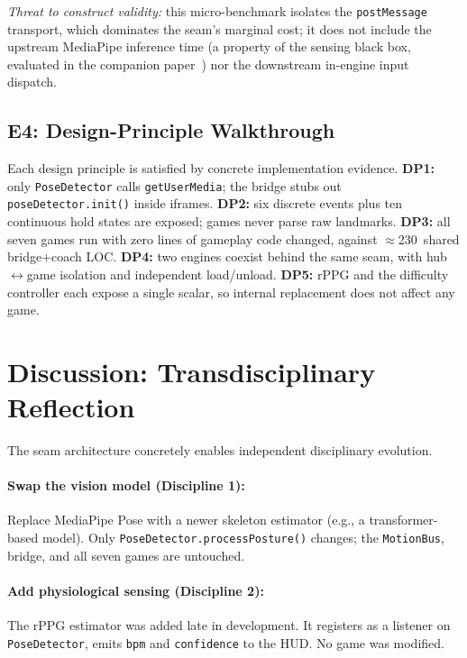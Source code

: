 \documentclass[runningheads]{llncs}
\newcommand{\motionbus}{\texttt{MotionBus}}
\newcommand{\postmsg}{\texttt{postMessage}}
\newcommand{\citecompanion}{\cite{companion2026}}
\begin{document}
\noindent\emph{Threat to construct validity:} this micro-benchmark isolates
the \postmsg{} transport, which dominates the seam's marginal cost; it does
not include the upstream MediaPipe inference time (a property of the sensing
black box, evaluated in the companion paper~\citecompanion{}) nor the
downstream in-engine input dispatch.

\subsection{E4: Design-Principle Walkthrough}

Each design principle is satisfied by concrete implementation evidence.
\textbf{DP1:} only \texttt{PoseDetector} calls \texttt{getUserMedia}; the bridge
stubs out \texttt{poseDetector.init()} inside iframes.
\textbf{DP2:} six discrete events plus ten continuous hold states are exposed;
games never parse raw landmarks.
\textbf{DP3:} all seven games run with zero lines of gameplay code changed,
against $\approx$230~shared bridge$+$coach LOC.
\textbf{DP4:} two engines coexist behind the same seam, with
hub$\leftrightarrow$game isolation and independent load/unload.
\textbf{DP5:} rPPG and the difficulty controller each expose a single scalar, so
internal replacement does not affect any game.

\section{Discussion: Transdisciplinary Reflection}
\label{sec:discussion}

The seam architecture concretely enables independent disciplinary
evolution.
\paragraph{Swap the vision model (Discipline 1):} Replace MediaPipe
Pose with a newer skeleton estimator (e.g., a transformer-based
model). Only \texttt{PoseDetector.processPosture()} changes; the
\motionbus{}, bridge, and all seven games are untouched.
\paragraph{Add physiological sensing (Discipline 2):} The rPPG
estimator was added late in development. It registers as a
listener on \texttt{PoseDetector}, emits \texttt{bpm} and
\texttt{confidence} to the HUD. No game was modified.
\end{document}
